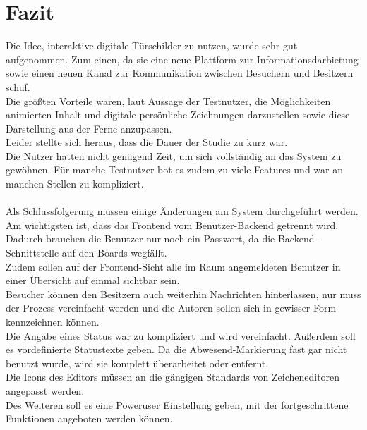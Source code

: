 \chapter{Fazit}\label{Fazit}
Die Idee, interaktive digitale Türschilder zu nutzen, wurde sehr gut aufgenommen.
Zum einen, da sie eine neue Plattform zur Informationsdarbietung sowie einen neuen Kanal zur Kommunikation zwischen Besuchern und Besitzern schuf.
\\
Die größten Vorteile waren, laut Aussage der Testnutzer, die Möglichkeiten animierten Inhalt und digitale persönliche Zeichnungen darzustellen sowie diese Darstellung aus der Ferne anzupassen.
\\
Leider stellte sich heraus, dass die Dauer der Studie zu kurz war.
\\
Die Nutzer hatten nicht genügend Zeit, um sich vollständig an das System zu gewöhnen.
Für manche Testnutzer bot es zudem zu viele Features und war an manchen Stellen zu kompliziert.
\\
\\
Als Schlussfolgerung müssen einige Änderungen am System durchgeführt werden.
Am wichtigsten ist, dass das Frontend vom Benutzer-Backend getrennt wird.
Dadurch brauchen die Benutzer nur noch ein Passwort, da die Backend-Schnittstelle auf den Boards wegfällt.
\\
Zudem sollen auf der Frontend-Sicht alle im Raum angemeldeten Benutzer in einer Übersicht auf einmal sichtbar sein.
\\
Besucher können den Besitzern auch weiterhin Nachrichten hinterlassen, nur muss der Prozess vereinfacht werden und die Autoren sollen sich in gewisser Form kennzeichnen können.
\\
Die Angabe eines Status war zu kompliziert und wird vereinfacht.
Außerdem soll es vordefinierte Statustexte geben.
Da die Abwesend-Markierung fast gar nicht benutzt wurde, wird sie komplett überarbeitet oder entfernt.
\\
Die Icons des Editors müssen an die gängigen Standards von Zeicheneditoren angepasst werden.
\\
Des Weiteren soll es eine Poweruser Einstellung geben, mit der fortgeschrittene Funktionen angeboten werden können.
